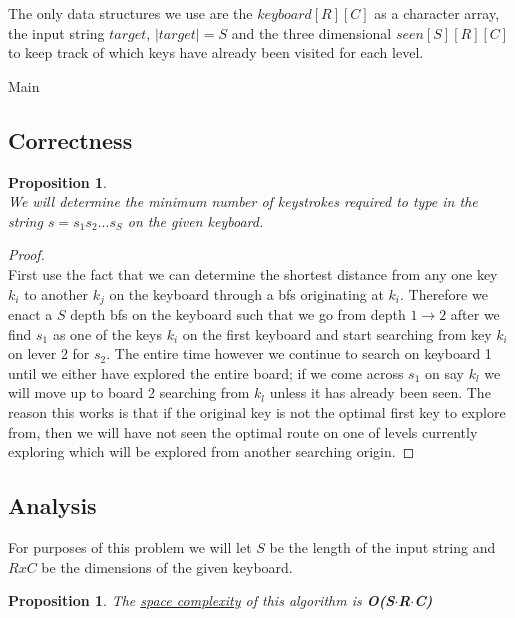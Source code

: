 \documentclass[12pt]{article}
\newtheorem{proposition}[theorem]{Proposition}
\begin{document}
The only data structures we use are the $keyboard[R][C]$ as a character array, the input string $target$,
$|target| = S$ and the three dimensional $seen[S][R][C]$ to keep track of which keys have already been visited
for each level.

\begin{algorithm}[H]
\caption{Main}
\begin{algorithmic}

    \EndProcedure
\end{algorithmic}
\end{algorithm}



\subsection{Correctness}
\begin{proposition}
~ \\ \indent We will determine the minimum number of keystrokes required to type in the string $s = s_1 s_2 ... s_S$
on the given keyboard.
\end{proposition}

\begin{proof}
~ \\ \indent First use the fact that we can determine the shortest distance from any one key $k_i$ to another $k_j$
on the keyboard through a bfs originating at $k_i$. Therefore we enact a $S$ depth bfs on the keyboard such that
we go from depth $1 \rightarrow 2$ after we find $s_1$ as one of the keys $k_i$ on the first keyboard and start
searching from key $k_i$ on lever 2 for $s_2$. The entire time however we continue to search on keyboard 1 until
we either have explored the entire board; if we come across $s_1$ on say $k_l$ we will move up to board 2
searching from $k_l$ unless it has already been seen. The reason this works is that if the original key is not the
optimal first key to explore from, then we will have not seen the optimal route on one of levels currently exploring
which will be explored from another searching origin.
\end{proof}


\subsection{Analysis}
For purposes of this problem we will let $S$ be the length of the input string and $RxC$ be the dimensions of the
given keyboard.
\begin{proposition}
\label{numq}
The \underline{space complexity} of this algorithm is \textbf{O(S$\cdot$R$\cdot$C)}
\end{proposition}
\end{document}
